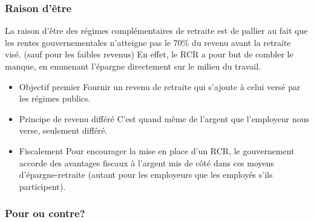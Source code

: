 \documentclass[10pt, french]{article}
\begin{document}
\begin{multicols*}{3}
\subsubsection*{Raison d'être}

La raison d'être des régimes complémentaires de retraite est de pallier au fait que les rentes gouvernementales n'atteigne pas le 70\% du revenu avant la retraite visé. (sauf pour les faibles revenus) En effet, le RCR a pour but de combler le manque, en emmenant l'épargne directement sur le milieu du travail.

\begin{itemize}
\item{Objectif premier} Fournir un revenu de retraite qui s'ajoute à celui versé par les régimes publics.
\item{Principe de revenu différé} C'est quand même de l'argent que l'employeur nous verse, seulement différé.
\item{Fiscalement} Pour encourager la mise en place d'un RCR, le gouvernement accorde des avantages fiscaux à l'argent mis de côté dans ces moyens d'épargne-retraite (autant pour les employeurs que les employés s'ils participent).
\end{itemize}

\subsubsection*{Pour ou contre?}


\end{multicols*}
\end{document}
